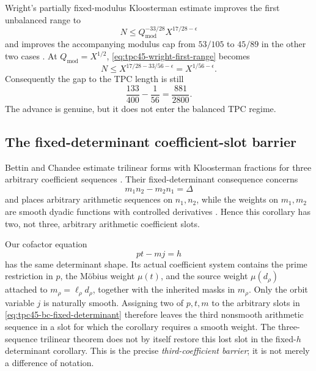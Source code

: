 Wright's partially fixed-modulus Kloosterman estimate improves the first
unbalanced range to
\begin{equation}
 N\le Q_{\mathrm{mod}}^{-33/28}X^{17/28-\epsilon}
 \label{eq:tpc45-wright-first-range}
\end{equation}
and improves the accompanying modulus cap from \(53/105\) to \(45/89\)
in the other two cases \cite[Corollary~2.2]{Wright2026}.  At
\(Q_{\mathrm{mod}}=X^{1/2}\), \eqref{eq:tpc45-wright-first-range} becomes
\[
 N\le X^{17/28-33/56-\epsilon}
   =X^{1/56-\epsilon}.
\]
Consequently the gap to the TPC length is still
\begin{equation}
 \frac{133}{400}-\frac1{56}
 =\frac{881}{2800}.
 \label{eq:tpc45-wright-exponent-deficit}
\end{equation}
The advance is genuine, but it does not enter the balanced TPC regime.

\subsection{The fixed-determinant coefficient-slot barrier}

Bettin and Chandee estimate trilinear forms with Kloosterman fractions
for three arbitrary coefficient sequences \cite[Theorem~1]{BC2018}.
Their fixed-determinant consequence concerns
\begin{equation}
 m_1n_2-m_2n_1=\Delta
 \label{eq:tpc45-bc-fixed-determinant}
\end{equation}
and places arbitrary arithmetic sequences on \(n_1,n_2\), while the
weights on \(m_1,m_2\) are smooth dyadic functions with controlled
derivatives \cite[Corollary~1]{BC2018}.  Hence this corollary has two,
not three, arbitrary arithmetic coefficient slots.

Our cofactor equation
\begin{equation}
 pt-mj=h
 \label{eq:tpc45-literature-determinant}
\end{equation}
has the same determinant shape.  Its actual coefficient system contains
the prime restriction in \(p\), the M\"obius weight \(\mu(t)\), and the
source weight \(\mu(d_\rho)\) attached to
\(m_\rho=\ell_\rho d_\rho\), together with the inherited masks in \(m_\rho\).
Only the orbit variable \(j\) is naturally smooth.  Assigning two of
\(p,t,m\) to the arbitrary slots in \eqref{eq:tpc45-bc-fixed-determinant}
therefore leaves the third nonsmooth arithmetic sequence in a slot for
which the corollary requires a smooth weight.  The three-sequence
trilinear theorem does not by itself restore this lost slot in the
fixed-\(h\) determinant corollary.  This is the precise
\emph{third-coefficient barrier}; it is not merely a difference of
notation.

